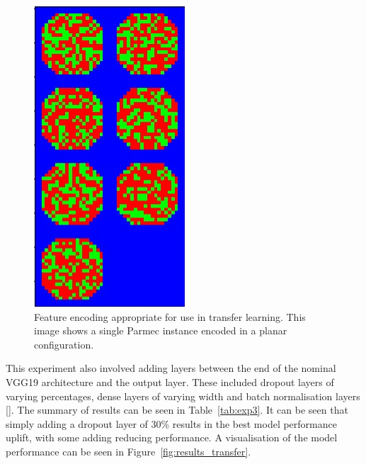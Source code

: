 \begin{figure}[h]
	\centering
	\includegraphics[scale=0.75]{Figures/vgg_encoding.png}
	\caption{Feature encoding appropriate for use in transfer learning. This image shows a single Parmec instance encoded in a planar configuration.}
	\label{fig:transfer_encoding}
\end{figure}

\noindent
This experiment also involved adding layers between the end of the nominal VGG19 architecture and the output layer. These included dropout layers of varying percentages, dense layers of varying width and batch normalisation layers [\cite{liao2016importance}]. The summary of results can be seen in Table~\ref{tab:exp3}. It can be seen that simply adding a dropout layer of 30\% results in the best model performance uplift, with some adding reducing performance. A visualisation of the model performance can be seen in Figure~\ref{fig:results_transfer}. 

